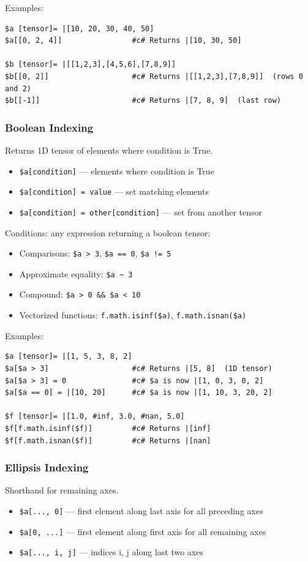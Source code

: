 Examples:
\begin{verbatim}
$a [tensor]= |[10, 20, 30, 40, 50]
$a[[0, 2, 4]]                #c# Returns |[10, 30, 50]

$b [tensor]= |[[1,2,3],[4,5,6],[7,8,9]]
$b[[0, 2]]                   #c# Returns |[[1,2,3],[7,8,9]]  (rows 0 and 2)
$b[[-1]]                     #c# Returns |[7, 8, 9]  (last row)
\end{verbatim}

\subsubsection{Boolean Indexing}
Returns 1D tensor of elements where condition is True.
\begin{itemize}
\item \texttt{\$a[condition]} --- elements where condition is True
\item \texttt{\$a[condition] = value} --- set matching elements
\item \texttt{\$a[condition] = other[condition]} --- set from another tensor
\end{itemize}

Conditions: any expression returning a boolean tensor:
\begin{itemize}
\item Comparisons: \texttt{\$a > 3}, \texttt{\$a == 0}, \texttt{\$a != 5}
\item Approximate equality: \texttt{\$a \textasciitilde{} 3}
\item Compound: \texttt{\$a > 0 \&\& \$a < 10}
\item Vectorized functions: \texttt{f.math.isinf(\$a)}, \texttt{f.math.isnan(\$a)}
\end{itemize}

Examples:
\begin{verbatim}
$a [tensor]= |[1, 5, 3, 8, 2]
$a[$a > 3]                   #c# Returns |[5, 8]  (1D tensor)
$a[$a > 3] = 0               #c# $a is now |[1, 0, 3, 0, 2]
$a[$a == 0] = |[10, 20]      #c# $a is now |[1, 10, 3, 20, 2]

$f [tensor]= |[1.0, #inf, 3.0, #nan, 5.0]
$f[f.math.isinf($f)]         #c# Returns |[inf]
$f[f.math.isnan($f)]         #c# Returns |[nan]
\end{verbatim}

\subsubsection{Ellipsis Indexing}
Shorthand for remaining axes.
\begin{itemize}
\item \texttt{\$a[..., 0]} --- first element along last axis for all preceding axes
\item \texttt{\$a[0, ...]} --- first element along first axis for all remaining axes
\item \texttt{\$a[..., i, j]} --- indices i, j along last two axes
\end{itemize}

